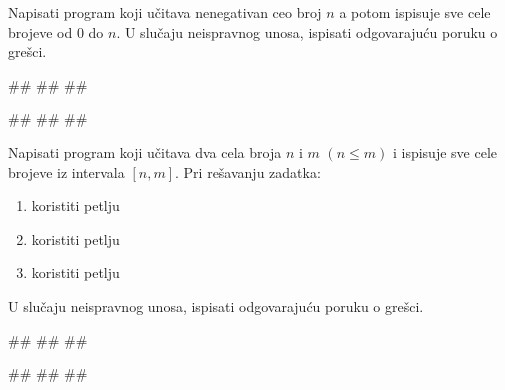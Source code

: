 \begin{Exercise}[label=PET_03] 
Napisati program koji učitava nenegativan ceo broj $n$
a potom ispisuje sve cele brojeve od $0$ do $n$. 
U slučaju neispravnog unosa, ispisati odgovarajuću poruku o grešci. 


\begin{miditest}
\begin{upotreba}{1}
#\naslovInt#
##
##
\end{upotreba}
\end{miditest}
\begin{miditest}
\begin{upotreba}{2}
#\naslovInt#
##
##
\end{upotreba}
\end{miditest}
\end{Exercise}
\ifresenja
\begin{Answer}[ref=PET_03]
\end{Answer}
\fi


\begin{Exercise}[label=PET_04] 
Napisati program koji učitava dva cela broja $n$ i $m$ $(n \leq m)$ i ispisuje sve
cele brojeve iz intervala $[n,m]$. Pri rešavanju zadatka: 
\begin{enumerate}
\setlength\itemsep{0em}
\item koristiti  petlju
\item koristiti  petlju
\item koristiti  petlju
 \end{enumerate}
U slučaju neispravnog unosa, ispisati odgovarajuću poruku o grešci. 


\begin{miditest}
\begin{upotreba}{1}
#\naslovInt#
##
##
\end{upotreba}
\end{miditest}
\begin{miditest}
\begin{upotreba}{2}
#\naslovInt#
##
##
\end{upotreba}
\end{miditest}
\end{Exercise}
\ifresenja
\begin{Answer}[ref=PET_04]
\end{Answer}
\fi


